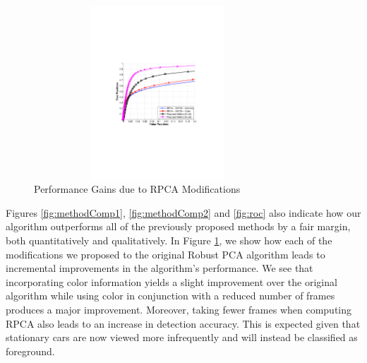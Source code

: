 \documentclass{article}
\begin{document}
\begin{figure}[t]
\begin{minipage}[b]{\linewidth}
  \centering
  \centerline{\includegraphics[trim = 35mm 87mm 30mm 92mm, clip, width=9.25cm, height =6.5cm]{Imgs/ROC_RPCA_IMP.pdf}}
\end{minipage}

\caption{Performance Gains due to RPCA Modifications}
\label{fig:roc2}
\end{figure}


Figures \ref{fig:methodComp1}, \ref{fig:methodComp2} and \ref{fig:roc} also indicate how our algorithm outperforms all of the previously proposed methods by a fair margin, both quantitatively and qualitatively. In Figure \ref{fig:roc2}, we show how each of the modifications we proposed to the original Robust PCA algorithm leads to incremental improvements in the algorithm's performance. We see that incorporating color information yields a slight improvement over the original algorithm while using color in conjunction with a reduced number of frames produces a major improvement. Moreover, taking fewer frames when computing RPCA also leads to an increase in detection accuracy. This is expected given that stationary cars are now viewed more infrequently and will instead be classified as foreground.%
\end{document}

